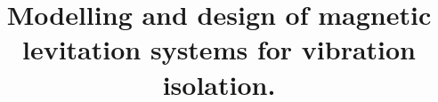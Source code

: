 \documentclass[11pt,a4paper]{memoir}
\begin{document}
\title{
Modelling and design of magnetic levitation systems for vibration isolation.
}

\begin{hideshorttoc}
\frontmatter
\pagestyle{plain}
\end{hideshorttoc}

\mainmatter
\null
\clearpage
\pagestyle{wspr}


\begin{hideshorttoc}
\backmatter
\clearpage

\clearpage
\end{hideshorttoc}

\thispagestyle{empty}
\null
\clearpage
\end{document}
